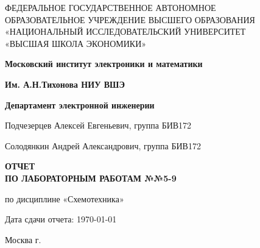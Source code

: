\begin{titlepage}
	\begin{center}
		ФЕДЕРАЛЬНОЕ  ГОСУДАРСТВЕННОЕ АВТОНОМНОЕ \\
		ОБРАЗОВАТЕЛЬНОЕ УЧРЕЖДЕНИЕ ВЫСШЕГО ОБРАЗОВАНИЯ\\
		«НАЦИОНАЛЬНЫЙ ИССЛЕДОВАТЕЛЬСКИЙ УНИВЕРСИТЕТ\\
		«ВЫСШАЯ ШКОЛА ЭКОНОМИКИ»
	\end{center}
	
	\begin{center}
		\textbf{Московский институт электроники и математики}
		
		\textbf{Им. А.Н.Тихонова НИУ ВШЭ}
		
		\textbf{Департамент электронной инженерии}
	\end{center}
	\vspace{1ex}	
	\begin{center}
		Подчезерцев Алексей Евгеньевич, группа БИВ172
		
		Солодянкин Андрей Александрович, группа БИВ172
	\end{center}	
	\vspace{1ex}
	\begin{center}
		\textbf{ОТЧЕТ\\
		ПО ЛАБОРАТОРНЫМ РАБОТАМ №№5-9
	}
	\end{center}	
	\vspace{2ex}
	\begin{center}
		по дисциплине «Схемотехника»
	\end{center}
	\vspace{2ex}
	\begin{center}
	Дата сдачи отчета: \today
	\end{center}
	\vspace{2ex}
	\vfill
	\begin{center}
		Москва \the\year г.
	\end{center}
\end{titlepage}